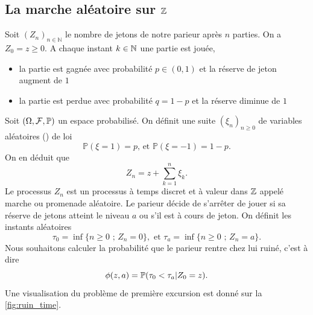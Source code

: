 \subsection{La marche aléatoire sur $\mathbb{Z}$}
Soit $(Z_n)_{n\in\mathbb{N}}$ le nombre de jetons de notre parieur après $n$ parties. On a $Z_0 = z\geq 0$. A chaque instant $k\in\mathbb{N}$ une partie est jouée, 
\begin{itemize}
    \item la partie est gagnée avec probabilité $p\in(0,1)$ et la réserve de jeton augment de $1$
    \item la partie est perdue avec probabilité $q = 1-p$ et la réserve diminue de $1$
\end{itemize}
Soit $(\Omega,\mathcal{F}, \mathbb{P})$ un espace probabilisé. On définit une suite $(\xi_n)_{n\geq0}$ \iid de variables aléatoires (\va) de loi 
$$
\mathbb{P}(\xi = 1) = p\text{, et }\mathbb{P}(\xi = -1) = 1-p.
$$
On en déduit que 
$$
Z_n = z +\sum_{k=1}^n\xi_k.
$$ 
Le processus $Z_n$ est un processus à temps discret et à valeur dans $\mathbb{Z}$ appelé marche ou promenade aléatoire. Le parieur décide de s'arrêter de jouer si sa réserve de jetons atteint le niveau $a$ ou s'il est à cours de jeton. On définit les instants aléatoires
\begin{equation}\label{eq:dp_time}
\tau_0 = \inf\{n\geq0\text{ ; }Z_n = 0\},\text{ et }\tau_a = \inf\{n\geq0\text{ ; }Z_n = a\}.
\end{equation}
Nous souhaitons calculer la probabilité que le parieur rentre chez lui ruiné, c'est à dire 
\begin{equation}\label{eq:ruin_proba}
\phi(z, a) = \mathbb{P}(\tau_0 <\tau_a| Z_0 = z).
\end{equation}
Une visualisation du problème de première excursion est donné sur la \cref{fig:ruin_time}.
